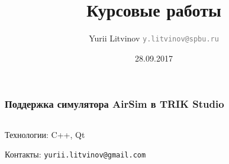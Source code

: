 \documentclass[xetex,mathserif,serif]{beamer}
\title{Курсовые работы}
\author[Юрий Литвинов]{Yurii Litvinov \newline 
	\textcolor{gray}{\small\texttt{y.litvinov@spbu.ru}}
}
\date{28.09.2017}
\begin{document}
	
	\begin{frame}
		\frametitle{Поддержка симулятора AirSim в TRIK Studio}
		\begin{columns}
			\begin{column}{0.5\textwidth}

				\footnotesize{}
			\end{column}
			\begin{column}{0.5\textwidth}

				\footnotesize{}
			\end{column}
		\end{columns}
		\vspace{0.7cm}
		Технологии: C++, Qt

		Контакты: \texttt{yurii.litvinov@gmail.com}
	\end{frame}
\end{document}
